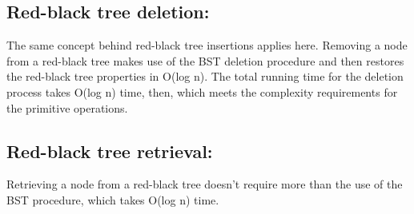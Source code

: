 \documentclass[12pt]{article}
\begin{document}
\subsection*{Red-black tree deletion:}

The same concept behind red-black tree insertions applies here. Removing a node from a red-black tree makes use of the BST deletion procedure and then restores the red-black tree properties in O(log n). The total running time for the deletion process takes O(log n) time, then, which meets the complexity requirements for the primitive operations.

\subsection*{Red-black tree retrieval:}
Retrieving a node from a red-black tree doesn’t require more than the use of the BST procedure, which takes O(log n) time.


\end{document}
